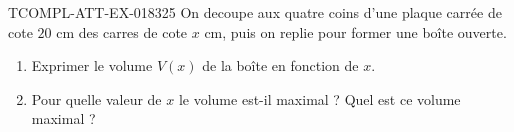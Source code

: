 \begin{exercice}{TCOMPL-ATT-EX-018}{3}{25}
On decoupe aux quatre coins d'une plaque carrée de cote $20$ cm des carres de cote $x$ cm, puis on replie pour former une boîte ouverte.
\begin{enumerate}
  \item Exprimer le volume $V(x)$ de la boîte en fonction de $x$.
  \item Pour quelle valeur de $x$ le volume est-il maximal ? Quel est ce volume maximal ?
\end{enumerate}

\end{exercice}
